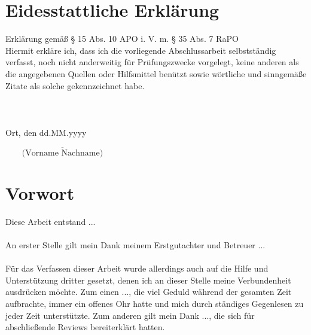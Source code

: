 \section*{Eidesstattliche Erklärung}
Erklärung gemäß § 15 Abs. 10 APO i. V. m. § 35 Abs. 7 RaPO
\\
Hiermit erkläre ich, dass ich die vorliegende Abschlussarbeit selbstständig verfasst, noch nicht anderweitig für Prüfungszwecke vorgelegt, keine anderen als die angegebenen Quellen oder Hilfsmittel benützt sowie wörtliche und sinngemäße Zitate als solche gekennzeichnet habe.
\\
\\
\\
\\

\noindent Ort, den dd.MM.yyyy
\begin{flushright}
	$\overline{~~~~~~~~~\mbox{(Vorname Nachname)}~~~~~~~~~}$
\end{flushright}


\section*{Vorwort}


Diese Arbeit entstand ... 
\\
\\
An erster Stelle gilt mein Dank meinem Erstgutachter und Betreuer ...
\\
\\
Für das Verfassen dieser Arbeit wurde allerdings auch auf die Hilfe und Unterstützung dritter gesetzt, denen ich an dieser Stelle meine Verbundenheit ausdrücken möchte. Zum einen ..., die viel Geduld während der gesamten Zeit aufbrachte, immer ein offenes Ohr hatte und mich durch ständiges Gegenlesen zu jeder Zeit unterstützte. Zum anderen gilt mein Dank ..., die sich für abschließende Reviews bereiterklärt hatten.